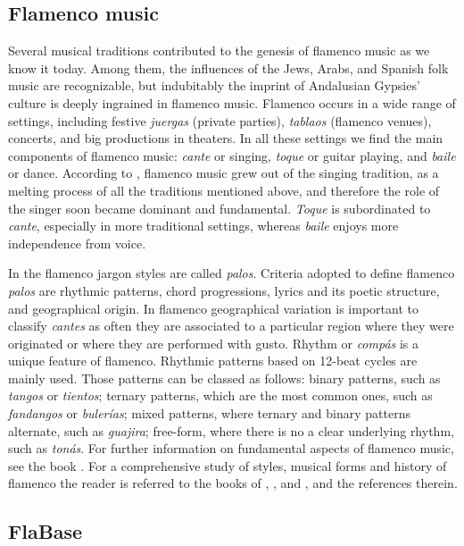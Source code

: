 \subsection{Flamenco music}
\label{sec:musicology:flamenco}

Several musical traditions contributed to the genesis of flamenco music as we know it today. Among them, the influences of the Jews, Arabs, and Spanish folk music are recognizable, but indubitably  the imprint of Andalusian Gypsies' culture is deeply ingrained in flamenco music. 
Flamenco occurs in a wide range of settings, including festive \textit{juergas} (private parties), \textit{tablaos} (flamenco venues), concerts, and big productions in theaters. In all these settings we find the main components of flamenco music: \textit{cante} or singing, \textit{toque} or guitar playing, and \textit{baile} or dance. According to \cite{gamboa-05}, flamenco music grew out of the singing tradition, as a melting process of all the traditions mentioned above, and therefore the role of the singer soon became dominant and fundamental. \textit{Toque}  is subordinated to \textit{cante}, especially in more traditional settings, whereas \textit{baile} enjoys more independence from voice. 

In the flamenco jargon styles are called \textit{palos}. Criteria adopted to define flamenco \textit{palos} are rhythmic patterns, chord progressions, lyrics and its poetic structure, and geographical origin. In flamenco geographical variation is important to classify \textit{cantes} as often they are associated to a particular region where they were originated or where they are performed with gusto. 
Rhythm or \textit{comp\'as} is a unique feature of flamenco.
Rhythmic patterns based on 12-beat cycles are mainly used. Those patterns can be classed as follows: binary patterns, such as \textit{tangos} or \textit{tientos}; ternary patterns, which are the most common ones, such as \textit{fandangos} or \textit{buler\'ias}; mixed patterns, where ternary and binary patterns alternate, such as \textit{guajira}; free-form, where there is no a clear underlying rhythm, such as \textit{ton\'as}.
For further information on fundamental aspects of flamenco music, see the book \cite{fer-04}. For a comprehensive study of styles, musical forms and history of flamenco the reader is referred to the books of \cite{bvrr-88}, \cite{nr-95}, and \cite{gamboa-05}, and the references therein.


\subsection{FlaBase}
\label{sec:musicology:flabase}

